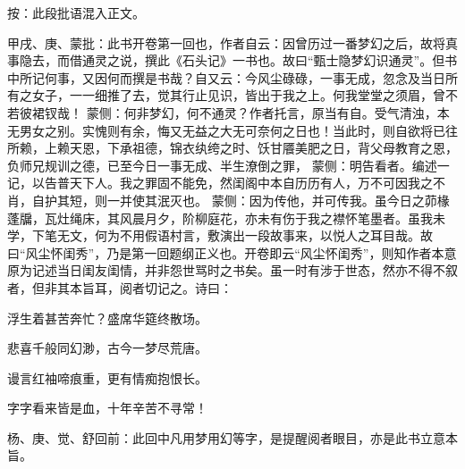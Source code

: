 
\begin{parag}
    \begin{note} \begin{subnote} 按：此段批语混入正文。\end{subnote}
        甲戌、庚、蒙批：此书开卷第一回也，作者自云：因曾历过一番梦幻之后，故将真事隐去，而借通灵之说，撰此《石头记》一书也。故曰“甄士隐梦幻识通灵”。但书中所记何事，又因何而撰是书哉？自又云：今风尘碌碌，一事无成，忽念及当日所有之女子，一一细推了去，觉其行止见识，皆出于我之上。何我堂堂之须眉，曾不若彼裙钗哉！ 蒙侧：何非梦幻，何不通灵？作者托言，原当有自。受气清浊，本无男女之别。实愧则有余，悔又无益之大无可奈何之日也！当此时，则自欲将已往所赖，上赖天恩，下承祖德，锦衣纨绔之时、饫甘餍美肥之日，背父母教育之恩，负师兄规训之德，已至今日一事无成、半生潦倒之罪， 蒙侧：明告看者。编述一记，以告普天下人。我之罪固不能免，然闺阁中本自历历有人，万不可因我之不肖，自护其短，则一并使其泯灭也。 蒙侧：因为传他，并可传我。虽今日之茆椽蓬牖，瓦灶绳床，其风晨月夕，阶柳庭花，亦未有伤于我之襟怀笔墨者。虽我未学，下笔无文，何为不用假语村言，敷演出一段故事来，以悦人之耳目哉。故曰“风尘怀闺秀”，乃是第一回题纲正义也。开卷即云“风尘怀闺秀”，则知作者本意原为记述当日闺友闺情，并非怨世骂时之书矣。虽一时有涉于世态，然亦不得不叙者，但非其本旨耳，阅者切记之。诗曰：
    \end{note}



    \begin{poem}
        \color{Mahogany}
        \begin{pl}浮生着甚苦奔忙？盛席华筵终散场。\end{pl}

        \begin{pl}悲喜千般同幻渺，古今一梦尽荒唐。\end{pl}

        \begin{pl}谩言红袖啼痕重，更有情痴抱恨长。\end{pl}

        \begin{pl}字字看来皆是血，十年辛苦不寻常！\end{pl}
    \end{poem}

\end{parag}

\begin{parag}
    \begin{note}杨、庚、觉、舒回前：此回中凡用梦用幻等字，是提醒阅者眼目，亦是此书立意本旨。\end{note}

\end{parag}


